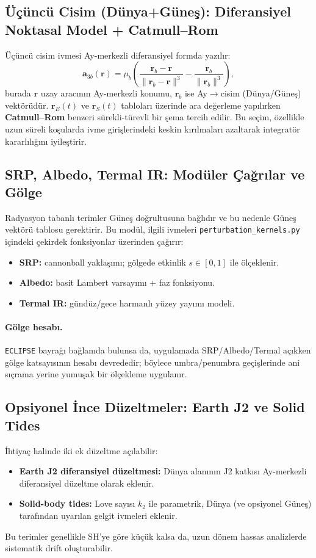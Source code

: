 \subsection*{Üçüncü Cisim (Dünya+Güneş): Diferansiyel Noktasal Model + Catmull--Rom}
Üçüncü cisim ivmesi Ay-merkezli diferansiyel formda yazılır:
\begin{equation}
\mathbf{a}_{3b}(\mathbf{r})=
\mu_b\left(
\frac{\mathbf{r}_b-\mathbf{r}}{\|\mathbf{r}_b-\mathbf{r}\|^3}
-
\frac{\mathbf{r}_b}{\|\mathbf{r}_b\|^3}
\right),
\label{eq:third_body}
\end{equation}
burada \(\mathbf{r}\) uzay aracının Ay-merkezli konumu, \(\mathbf{r}_b\) ise Ay\(\rightarrow\)cisim (Dünya/Güneş) vektörüdür.
\(\mathbf r_E(t)\) ve \(\mathbf r_S(t)\) tabloları üzerinde ara değerleme yapılırken
\textbf{Catmull--Rom} benzeri sürekli-türevli bir şema tercih edilir.
Bu seçim, özellikle uzun süreli koşularda ivme girişlerindeki keskin kırılmaları azaltarak integratör kararlılığını iyileştirir.

\subsection*{SRP, Albedo, Termal IR: Modüler Çağrılar ve Gölge}
Radyasyon tabanlı terimler Güneş doğrultusuna bağlıdır ve bu nedenle Güneş vektörü tablosu gerektirir.
Bu modül, ilgili ivmeleri \texttt{perturbation\_kernels.py} içindeki çekirdek fonksiyonlar üzerinden çağırır:
\begin{itemize}
  \item \textbf{SRP:} cannonball yaklaşımı; gölgede etkinlik \(s\in[0,1]\) ile ölçeklenir.
  \item \textbf{Albedo:} basit Lambert varsayımı + faz fonksiyonu.
  \item \textbf{Termal IR:} gündüz/gece harmanlı yüzey yayımı modeli.
\end{itemize}
\paragraph{Gölge hesabı.}
\texttt{ECLIPSE} bayrağı bağlamda bulunsa da, uygulamada SRP/Albedo/Termal açıkken gölge katsayısının
hesabı devrededir; böylece umbra/penumbra geçişlerinde ani sıçrama yerine yumuşak bir ölçekleme uygulanır.

\subsection*{Opsiyonel İnce Düzeltmeler: Earth J2 ve Solid Tides}
İhtiyaç halinde iki ek düzeltme açılabilir:
\begin{itemize}
  \item \textbf{Earth J2 diferansiyel düzeltmesi:} Dünya alanının J2 katkısı Ay-merkezli diferansiyel düzeltme olarak eklenir.
  \item \textbf{Solid-body tides:} Love sayısı \(k_2\) ile parametrik, Dünya (ve opsiyonel Güneş) tarafından uyarılan gelgit ivmeleri eklenir.
\end{itemize}
Bu terimler genellikle SH’ye göre küçük kalsa da, uzun dönem hassas analizlerde sistematik drift oluşturabilir.

